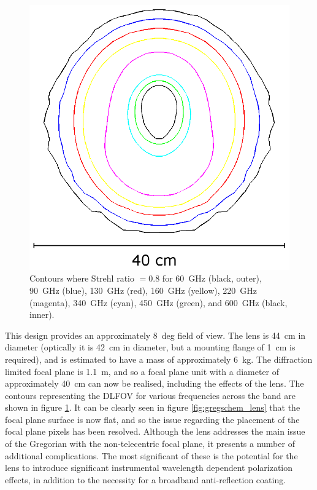 \documentclass[11pt,a4paper]{article}
\begin{document}
\begin{figure}[htbp]
	\centering
	\includegraphics[scale=0.5]{core_greg_lens_strehl.png}
	\caption{Contours where Strehl ratio $= 0.8$ for 60~GHz (black, outer), 90~GHz (blue), 130~GHz (red),
                 160~GHz (yellow), 220~GHz (magenta), 340~GHz (cyan), 450~GHz (green), and 600~GHz (black, inner).
                 }
	\label{fig:greg_lens_strehl}
\end{figure}
This design provides an approximately 8~deg field of view. The lens is 44~cm in diameter (optically it is 42~cm in diameter, but a mounting flange of 1~cm is required), and is estimated to have a mass of approximately 6~kg. The diffraction limited focal plane is 1.1~m, and so a focal plane unit with a diameter of approximately 40~cm can now be realised, including the effects of the lens. The contours representing the DLFOV for various frequencies across the band are shown in figure \ref{fig:greg_lens_strehl}. It can be clearly seen in figure \ref{fig:gregschem_lens} that the focal plane surface is now flat, and so the issue regarding the placement of the focal plane pixels has been resolved. Although the lens addresses the main issue of the Gregorian with the non-telecentric focal plane, it presents a number of additional complications. The most significant of these is the potential for the lens to introduce significant instrumental wavelength dependent polarization effects, in addition to the necessity for a broadband anti-reflection coating.
\end{document}
